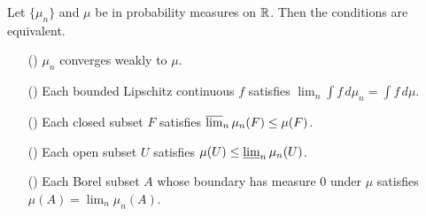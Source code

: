\begin{theorem}\label{measure weak converge iff}
Let $\{\mu_n\}$ and $\mu$ be in probability measures on $\mathbb{R}$. Then the conditions are equivalent.
\begin{itemize}
\item[(\rmnum{1})] $\mu_n$ converges weakly to $\mu$.
\item[(\rmnum{2})] Each bounded Lipschitz continuous $f$ satisfies $\lim_n\int f\,d\mu_n=\int f\,d\mu$. 
\item[(\rmnum{2})] Each closed subset $F$ satisfies $\varlimsup_n\mu_n(F)\leq\mu(F)$.
\item[(\rmnum{3})] Each open subset $U$ satisfies $\mu(U)\leq\varliminf_n\mu_n(U)$.
\item[(\rmnum{4})] Each Borel subset $A$ whose boundary has measure $0$ under $\mu$ satisfies $\mu(A)=\lim_n\mu_n(A)$. 
\end{itemize}
\end{theorem}
